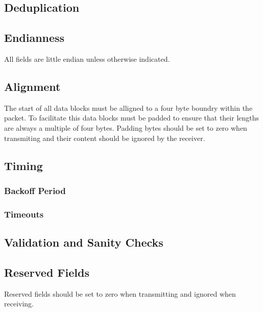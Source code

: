 \subsection {Deduplication}
\label{subsec:other-considerations_deduplication}

\subsection{Endianness}

All fields are little endian unless otherwise indicated.

\subsection{Alignment}

The start of all data blocks must be alligned to a four byte boundry within the
packet. To facilitate this data blocks must be padded to ensure that their
lengths are always a multiple of four bytes. Padding bytes should be set to zero
when transmiting and their content should be ignored by the receiver.

\subsection{Timing}

\subsubsection{Backoff Period}

\subsubsection{Timeouts}

\subsection{Validation and Sanity Checks}

\subsection{Reserved Fields}

Reserved fields should be set to zero when transmitting and ignored when
receiving.

